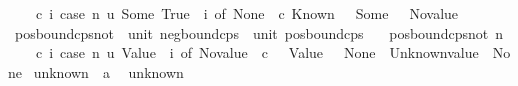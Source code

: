 \begin{isabellebody}
\ \ \ \ {\isacharparenleft}{\kern0pt}{\isasymlambda}c\ i{\isachardot}{\kern0pt}\ case\ n\ {\isacharparenleft}{\kern0pt}{\isasymlambda}u{\isachardot}{\kern0pt}\ Some\ {\isacharparenleft}{\kern0pt}True{\isacharcomma}{\kern0pt}\ {\isacharbrackleft}{\kern0pt}{\isacharbrackright}{\kern0pt}{\isacharparenright}{\kern0pt}{\isacharparenright}{\kern0pt}\ i\ of\ None\ {\isasymRightarrow}\ c\ {\isacharparenleft}{\kern0pt}Known\ {\isacharparenleft}{\kern0pt}{\isacharparenright}{\kern0pt}{\isacharparenright}{\kern0pt}\ {\isacharbar}{\kern0pt}\ Some\ {\isacharunderscore}{\kern0pt}\ {\isasymRightarrow}\ No{\isacharunderscore}{\kern0pt}value{\isacharparenright}{\kern0pt}{\isachardoublequoteclose}\isanewline
\isanewline
{}\isamarkupfalse%
\ pos{\isacharunderscore}{\kern0pt}bound{\isacharunderscore}{\kern0pt}cps{\isacharunderscore}{\kern0pt}not\ {\isacharcolon}{\kern0pt}{\isacharcolon}{\kern0pt}\ {\isachardoublequoteopen}unit\ neg{\isacharunderscore}{\kern0pt}bound{\isacharunderscore}{\kern0pt}cps\ {\isasymRightarrow}\ unit\ pos{\isacharunderscore}{\kern0pt}bound{\isacharunderscore}{\kern0pt}cps{\isachardoublequoteclose}\isanewline
\ \ \ {\isachardoublequoteopen}pos{\isacharunderscore}{\kern0pt}bound{\isacharunderscore}{\kern0pt}cps{\isacharunderscore}{\kern0pt}not\ n\ {\isacharequal}{\kern0pt}\isanewline
\ \ \ \ {\isacharparenleft}{\kern0pt}{\isasymlambda}c\ i{\isachardot}{\kern0pt}\ case\ n\ {\isacharparenleft}{\kern0pt}{\isasymlambda}u{\isachardot}{\kern0pt}\ Value\ {\isacharbrackleft}{\kern0pt}{\isacharbrackright}{\kern0pt}{\isacharparenright}{\kern0pt}\ i\ of\ No{\isacharunderscore}{\kern0pt}value\ {\isasymRightarrow}\ c\ {\isacharparenleft}{\kern0pt}{\isacharparenright}{\kern0pt}\ {\isacharbar}{\kern0pt}\ Value\ {\isacharunderscore}{\kern0pt}\ {\isasymRightarrow}\ None\ {\isacharbar}{\kern0pt}\ Unknown{\isacharunderscore}{\kern0pt}value\ {\isasymRightarrow}\ None{\isacharparenright}{\kern0pt}{\isachardoublequoteclose}%
\isadelimdocument
%
\endisadelimdocument
%
\isatagdocument
%
\isamarkuptrue%
%
\endisatagdocument
{\isafolddocument}%
%
\isadelimdocument
%
\endisadelimdocument
{}\isamarkupfalse%
\ unknown\ {\isacharcolon}{\kern0pt}{\isacharcolon}{\kern0pt}\ {\isacharprime}{\kern0pt}a\isanewline
\isanewline
{}\isamarkupfalse%
\ {\isacharparenleft}{\kern0pt}\ unknown\ \ {\isacharparenleft}{\kern0pt}{\isachardoublequoteopen}{\isacharquery}{\kern0pt}{\isachardoublequoteclose}{\isacharparenright}{\kern0pt}\isanewline

\end{isabellebody}
